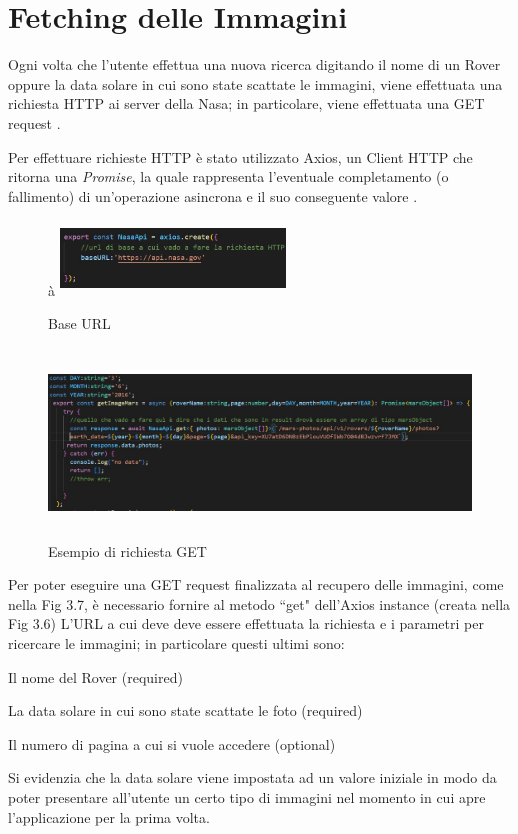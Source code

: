 \section{Fetching delle Immagini}
Ogni volta che l'utente effettua una nuova ricerca digitando il nome di un Rover oppure la data solare in cui sono state scattate le immagini, viene effettuata una richiesta HTTP ai server della Nasa; in particolare, viene effettuata una GET request \cite{Axios}.

Per effettuare richieste HTTP \`e stato utilizzato Axios, un Client HTTP che ritorna una \textit{Promise}, la quale rappresenta l'eventuale completamento {}(o fallimento) di un'operazione asincrona e il suo conseguente valore \cite{Promise}.
\begin{figure}[h]
    \centering\`a
    \includegraphics[width=6cm, height=2cm]{images/baseUrl.jpg}
    \caption[differenzeiteot]{Base URL}
    \label{fig:baseUrl}
\end{figure}
\begin{figure}[h]
    \centering
    \includegraphics[width=14cm, height=5cm]{images/getRequest.jpg}
    \caption[differenzeiteot]{Esempio di richiesta GET}
    \label{fig:getRequest}
\end{figure}

Per poter eseguire una GET request finalizzata al recupero delle immagini, come nella Fig 3.7, \`e necessario fornire al metodo ``get" dell'Axios instance {}(creata nella Fig 3.6) L'URL a cui deve deve essere effettuata la richiesta e i parametri per ricercare le immagini; in particolare questi ultimi sono:
\begin{list}{*}{}
    \item Il nome del Rover {}(required)
    \item La data solare in cui sono state scattate le foto {}(required)
    \item Il numero di pagina a cui si vuole accedere {}(optional)
\end{list}
Si evidenzia che la data solare viene impostata ad un valore iniziale in modo da poter presentare all'utente un certo tipo di immagini nel momento in cui apre l'applicazione per la prima volta.

